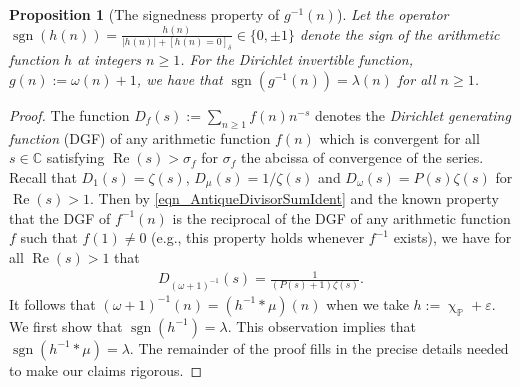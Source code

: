 \documentclass[11pt,reqno,a4letter]{article}
\numberwithin{figure}{section}
\numberwithin{table}{section}
\newcommand{\Iverson}[1]{\ensuremath{\left[#1\right]_{\delta}}}
\renewcommand{\chi}{\upchi}
\theoremstyle{plain}
\newtheorem{prop}[theorem]{Proposition}
\numberwithin{theorem}{section}
\theoremstyle{definition}
\newcommand{\NBRef}[1]{}
\renewcommand{\Re}{\operatorname{Re}}
\begin{document}
\begin{prop}[The signedness property of $g^{-1}(n)$]
\label{prop_SignageDirInvsOfPosBddArithmeticFuncs_v1} 
Let the operator 
$\operatorname{sgn}(h(n)) = \frac{h(n)}{|h(n)| + \Iverson{h(n) = 0}} \in \{0, \pm 1\}$ denote the sign 
of the arithmetic function $h$ at integers $n \geq 1$. 
For the Dirichlet invertible function, $g(n) := \omega(n) + 1$, 
we have that $\operatorname{sgn}(g^{-1}(n)) = \lambda(n)$ for all $n \geq 1$. 
\NBRef{A02-2020-04-26}
\end{prop} 
\begin{proof} 
The function $D_f(s) := \sum_{n \geq 1} f(n) n^{-s}$ denotes the 
\emph{Dirichlet generating function} (DGF) of any 
arithmetic function $f(n)$ which is convergent for all $s \in \mathbb{C}$ satisfying 
$\Re(s) > \sigma_f$ for $\sigma_f$ the abcissa of convergence of the series. 
Recall that $D_1(s) = \zeta(s)$, $D_{\mu}(s) = 1 / \zeta(s)$ and $D_{\omega}(s) = P(s) \zeta(s)$ for 
$\Re(s) > 1$. 
Then by \eqref{eqn_AntiqueDivisorSumIdent} and the known property that the DGF of $f^{-1}(n)$ is 
the reciprocal of the DGF of any arithmetic function $f$ such that $f(1) \neq 0$ 
(e.g., this property holds whenever $f^{-1}$ exists), 
we have for all $\Re(s) > 1$ that 
\begin{align} 
\label{eqn_DGF_of_gInvn} 
D_{(\omega+1)^{-1}}(s) = \frac{1}{(P(s)+1) \zeta(s)}. 
\end{align} 
It follows that $(\omega + 1)^{-1}(n) = (h^{-1} \ast \mu)(n)$ when we take 
$h := \chi_{\mathbb{P}} + \varepsilon$. 
We first show that $\operatorname{sgn}(h^{-1}) = \lambda$. 
This observation implies 
that $\operatorname{sgn}(h^{-1} \ast \mu) = \lambda$. The remainder of the proof fills in the 
precise details needed to make our claims rigorous. 


\end{proof}
\end{document}
